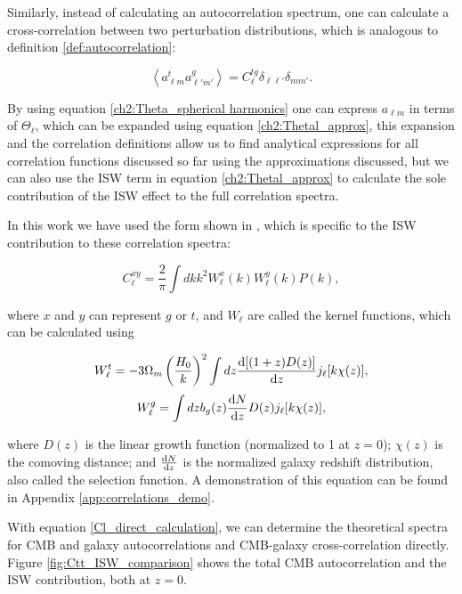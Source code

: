 \documentclass[openany,a4paper,12pt,oneside]{book}
\newcommand{\av}[1]{\left\langle #1 \right\rangle} %
\begin{document}
\begin{spacing}{1.5}
Similarly, instead of calculating an autocorrelation spectrum, one can calculate a cross-correlation between two perturbation distributions, which is analogous to definition \eqref{def:autocorrelation}:

\begin{equation}\label{av(ag, at)}
    \av{a_{\ell m}^ta_{\ell' m'}^g}=C^{tg}_\ell\delta_{\ell \ell'}\delta_{mm'}.
\end{equation}

By using equation \eqref{ch2:Theta_spherical harmonics} one can express $a_{\ell m}$ in terms of $\Theta_\ell$, which can be expanded using equation \eqref{ch2:Thetal_approx}, this expansion and the correlation definitions allow us to find analytical expressions for all correlation functions discussed so far using the approximations discussed, but we can also use the ISW term in equation \eqref{ch2:Thetal_approx} to calculate the sole contribution of the ISW effect to the full correlation spectra. 

In this work we have used the form shown in \cite{Moura-Santos_2016}, which is specific to the ISW contribution to these correlation spectra:

\begin{equation}\label{Cl_direct_calculation}
    C^{xy}_\ell=\frac{2}{\pi}\int dk k^2 W_\ell^x(k)W_\ell^y(k)P(k),
\end{equation}

\noindent where $x$ and $y$ can represent $g$ or $t$, and $W_\ell$ are called the kernel functions, which can be calculated using

\begin{equation}\label{Wt}
    W_\ell^t=-3\Omega_m\left(\frac{H_0}{k}\right)^2\int dz \dv{[(1+z)D(z)]}{z} j_\ell[k\chi(z)],
\end{equation}
\begin{equation}\label{Wg}
    W_\ell^g=\int dz b_g(z)\dv{N}{z}D(z)j_\ell[k\chi(z)],
\end{equation}

\noindent where $D(z)$ is the linear growth function (normalized to 1 at $z=0$); $\chi(z)$ is the comoving distance; and $\dv{N}{z}$ is the normalized galaxy redshift distribution, also called the selection function\cite{cross_corr:Afshordi}. A demonstration of this equation can be found in Appendix \ref{app:correlations_demo}.

With equation \eqref{Cl_direct_calculation}, we can determine the theoretical spectra for CMB and galaxy autocorrelations and CMB-galaxy cross-correlation directly. Figure \ref{fig:Ctt_ISW_comparison} shows the total CMB autocorrelation and the ISW contribution, both at $z=0$.


\end{spacing}
\end{document}
